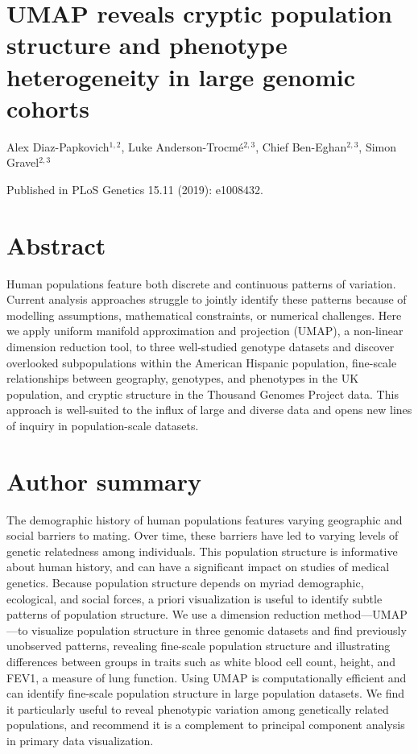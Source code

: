 \section*{UMAP reveals cryptic population structure and phenotype heterogeneity in large genomic cohorts}

Alex Diaz-Papkovich$^{1,2}$, Luke Anderson-Trocm\'{e}$^{2,3}$, Chief Ben-Eghan$^{2,3}$, Simon Gravel$^{2,3}$


Published in PLoS Genetics 15.11 (2019): e1008432.

\section{Abstract}

Human populations feature both discrete and continuous patterns of variation. Current analysis approaches struggle to jointly identify these patterns because of modelling assumptions, mathematical constraints, or numerical challenges. Here we apply uniform manifold approximation and projection (UMAP), a non-linear dimension reduction tool, to three well-studied genotype datasets and discover overlooked subpopulations within the American Hispanic population, fine-scale relationships between geography, genotypes, and phenotypes in the UK population, and cryptic structure in the Thousand Genomes Project data. This approach is well-suited to the influx of large and diverse data and opens new lines of inquiry in population-scale datasets.

\section{Author summary}

The demographic history of human populations features varying geographic and social barriers to mating. Over time, these barriers have led to varying levels of genetic relatedness among individuals.  This population structure is informative about human history, and can have a significant impact on studies of medical genetics. Because population structure depends on myriad demographic, ecological, and social forces, a priori visualization is useful to identify subtle patterns of population structure. We use a dimension reduction method---UMAP---to visualize population structure in three genomic datasets and find previously unobserved patterns, revealing fine-scale population structure and illustrating differences between groups in traits such as white blood cell count, height, and FEV1, a measure of lung function. Using UMAP is computationally efficient and can identify fine-scale population structure in large population datasets. We find it particularly useful to reveal phenotypic variation among genetically related populations, and recommend it is a complement  to principal component analysis in primary data visualization. 

